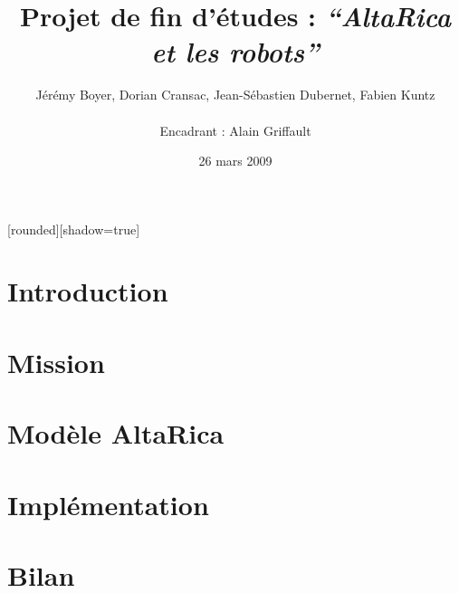\documentclass[8pt]{beamer}
\begin{document}

[rounded][shadow=true]

\author[J. Boyer, D. Cransac, J-S. Dubernet, F. Kuntz - Encadrant :
A. Griffault]{Jérémy Boyer, Dorian Cransac, Jean-Sébastien Dubernet,
Fabien Kuntz\\
~\\
\small Encadrant : Alain Griffault}
\title{Projet de fin d'études : \textit{``AltaRica et les robots''}} 
\date{\footnotesize 26 mars 2009}

\setcounter{page}{1}

\frame{\titlepage}
\frame{\tableofcontents}

 \section{Introduction}
 \frame{\tableofcontents[current]}
 

 \section{Mission}
 \frame{\tableofcontents[current]}
%  
%  

 \section{Modèle AltaRica}
 \frame{\tableofcontents[current]}
 
  
 \section{Implémentation}
 \frame{\tableofcontents[current]}
%  
%  

 \section{Bilan}
 \frame{\tableofcontents[current]}


\end{document}
